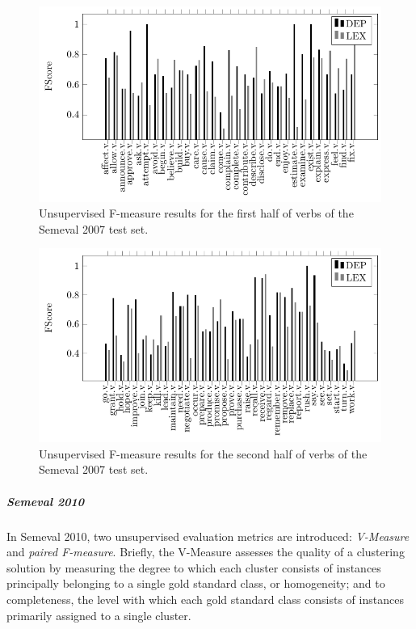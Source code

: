  \begin{figure}[!htb]
\centering
\includegraphics[width=1\linewidth]{images/Chapitre5/tex_img_files/verbs_fs_2.pdf}
\caption{Unsupervised F-measure results for the first half of verbs of the Semeval 2007 test set.}
\label{fig:verbs_fs2}
\end{figure}

 \begin{figure}[!htb]
\centering
\includegraphics[width=1\linewidth]{images/Chapitre5/tex_img_files/verbs_fs_3.pdf}
\caption{Unsupervised F-measure results for the second half of verbs of the Semeval 2007 test set.}
\label{fig:verbs_fs3}
\end{figure}



\subparagraph{Semeval 2010}
In Semeval 2010, two unsupervised evaluation metrics are introduced: \textit{V-Measure} and \textit{paired F-measure}. Briefly, the V-Measure assesses the quality of a clustering solution by measuring the degree to which each cluster consists of instances principally belonging to a single gold standard class, or homogeneity; and to completeness, the level with which each gold standard class consists of instances primarily assigned to a single cluster.

